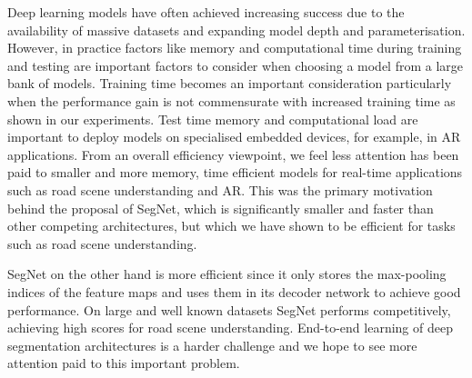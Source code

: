 Deep learning models have often achieved increasing success due
to the availability of massive datasets and expanding model depth
and parameterisation. However, in practice factors like memory
and computational time during training and testing are important
factors to consider when choosing a model from a large bank
of models. Training time becomes an important consideration
particularly when the performance gain is not commensurate with
increased training time as shown in our experiments. Test time
memory and computational load are important to deploy models
on specialised embedded devices, for example, in AR applications.
From an overall efficiency viewpoint, we feel less attention has
been paid to smaller and more memory, time efficient models for
real-time applications such as road scene understanding and AR.
This was the primary motivation behind the proposal of SegNet,
which is significantly smaller and faster than other competing
architectures, but which we have shown to be efficient for tasks
such as road scene understanding.

SegNet on the
other hand is more efficient since it only stores the max-pooling
indices of the feature maps and uses them in its decoder network
to achieve good performance. On large and well known datasets
SegNet performs competitively, achieving high scores for road
scene understanding. End-to-end learning of deep segmentation
architectures is a harder challenge and we hope to see more
attention paid to this important problem.




